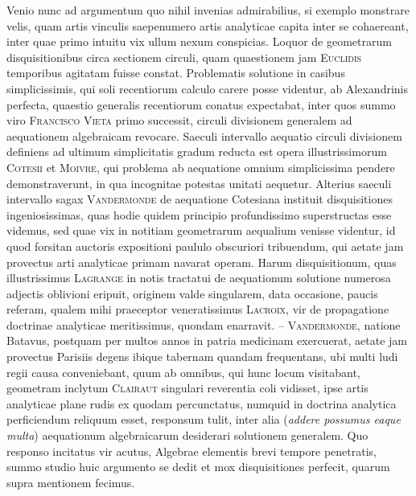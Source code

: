 \documentclass[11pt]{article}
\newcommand{\scn}[1]{\textsc{#1}}
\begin{document}
Venio nunc ad argumentum quo nihil invenias admirabilius, si exemplo monstrare velis, quam artis vinculis saepenumero artis analyticae capita inter se cohaereant, inter quae primo intuitu vix ullum nexum conspicias. Loquor de geometrarum disquisitionibus circa sectionem circuli, quam quaestionem jam \scn{Euclidis} temporibus agitatam fuisse constat. Problematis solutione in casibus simplicissimis, qui soli recentiorum calculo carere posse videntur, ab Alexandrinis perfecta, quaestio generalis recentiorum conatus expectabat, inter quos summo viro \scn{Francisco Vieta} primo successit, circuli divisionem generalem ad aequationem algebraicam revocare. Saeculi intervallo aequatio circuli divisionem definiens ad ultimum simplicitatis gradum reducta est opera illustrissimorum \scn{Cotesii} et \scn{Moivre}, qui problema ab aequatione omnium simplicissima pendere demonstraverunt, in qua incognitae potestas unitati aequetur. Alterius saeculi intervallo sagax \scn{Vandermonde} de aequatione Cotesiana instituit disquisitiones ingeniosissimas, quas hodie quidem principio profundissimo superstructas esse videmus, sed quae vix in notitiam geometrarum aequalium venisse videntur, id quod forsitan auctoris expositioni paululo obscuriori tribuendum, qui aetate jam provectus arti analyticae primam navarat operam. Harum disquisitionum, quas illustrissimus \scn{Lagrange} in notis tractatui de aequationum solutione numerosa adjectis oblivioni eripuit, originem valde singularem, data occasione, paucis referam, qualem mihi praeceptor veneratissimus \scn{Lacroix}, vir de propagatione doctrinae analyticae meritissimus, quondam enarravit. -- \scn{Vandermonde}, natione Batavus, postquam per multos annos in patria medicinam exercuerat, aetate jam provectus Parisiis degens ibique tabernam quandam frequentans, ubi multi ludi regii causa conveniebant, quum ab omnibus, qui hunc locum visitabant, geometram inclytum \scn{Clairaut} singulari reverentia coli vidisset, ipse artis analyticae plane rudis ex quodam percunctatus, numquid in doctrina analytica perficiendum reliquum esset, responsum tulit, inter alia (\emph{addere possumus eaque multa}) aequationum algebraicarum desiderari solutionem generalem. Quo responso incitatus vir acutus, Algebrae elementis brevi tempore penetratis, summo studio huic argumento se dedit et mox disquisitiones perfecit, quarum supra mentionem fecimus.
\end{document}
